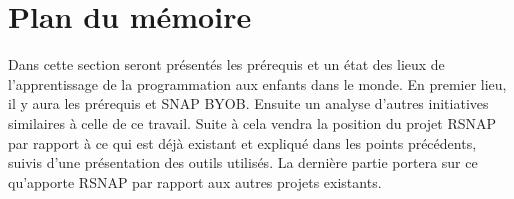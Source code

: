 \section{Plan du mémoire}
Dans cette section seront présentés les prérequis et un état des lieux de l'apprentissage de la programmation aux enfants dans le monde. En premier lieu, il y aura les prérequis et SNAP BYOB. Ensuite un analyse d'autres initiatives similaires à celle de ce travail. Suite à cela vendra la position du projet RSNAP par rapport à ce qui est déjà existant et expliqué dans les points précédents, suivis d'une présentation des outils utilisés. La dernière partie portera sur ce qu'apporte RSNAP par rapport aux autres projets existants. 
